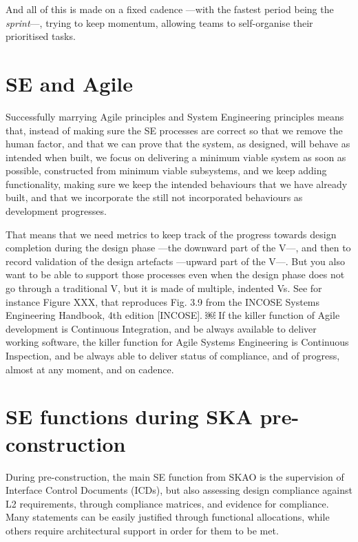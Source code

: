 \documentclass[11pt,twoside]{article}
\begin{document}
And all of this is made on a fixed cadence —with the fastest period being the \emph{sprint}—, trying to keep momentum, allowing teams to self-organise their prioritised tasks.	


\section{SE and Agile} %
\label{sec:se_and_agile}
Successfully marrying Agile principles and System Engineering principles means that, instead of making sure the SE processes are correct so that we remove the human factor, and that we can prove that the system, as designed, will behave as intended when built, we focus on delivering a minimum viable system as soon as possible, constructed from minimum viable subsystems, and we keep adding functionality, making sure we keep the intended behaviours that we have already built, and that we incorporate the still not incorporated behaviours as development progresses.	

That means that we need metrics to keep track of the progress towards design completion during the design phase —the downward part of the V—, and then to record validation of the design artefacts —upward part of the V—. But you also want to be able to support those processes even when the design phase does not go through a traditional V, but it is made of multiple, indented Vs. See for instance Figure XXX, that reproduces Fig. 3.9 from the INCOSE Systems Engineering Handbook, 4th edition [INCOSE].	
￼	
If the killer function of Agile development is Continuous Integration, and be always available to deliver working software, the killer function for Agile Systems Engineering is Continuous Inspection, and be always able to deliver status of compliance, and of progress, almost at any moment, and on cadence.	


\section{SE functions during SKA pre-construction} %
\label{sec:se_functions_during_ska_pre_construction}
During pre-construction, the main SE function from SKAO is the supervision of Interface Control Documents (ICDs), but also assessing design compliance against L2 requirements, through compliance matrices, and evidence for compliance. Many statements can be easily justified through functional allocations, while others require architectural support in order for them to be met.
\end{document}
